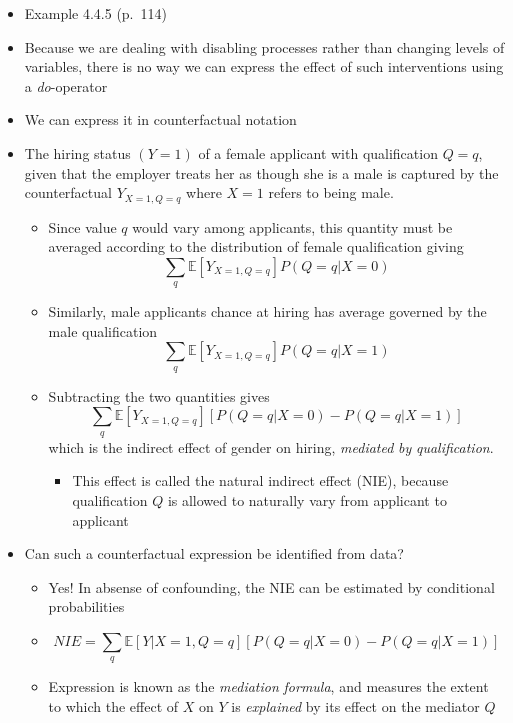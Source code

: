 \documentclass[]{article}
\providecommand{\tightlist}{%
  \setlength{\itemsep}{0pt}\setlength{\parskip}{0pt}}
\begin{document}
\begin{itemize}
\item
  Example 4.4.5 (p.~114)
\item
  Because we are dealing with disabling processes rather than changing
  levels of variables, there is no way we can express the effect of such
  interventions using a \emph{do}-operator
\item
  We can express it in counterfactual notation
\item
  The hiring status \((Y=1)\) of a female applicant with qualification
  \(Q = q\), given that the employer treats her as though she is a male
  is captured by the counterfactual \(Y_{X = 1, Q = q}\) where \(X = 1\)
  refers to being male.

  \begin{itemize}
  \item
    Since value \(q\) would vary among applicants, this quantity must be
    averaged according to the distribution of female qualification
    giving \[\sum\limits_q \mathbb{E}[Y_{X=1, Q = q}]P(Q = q|X = 0)\]
  \item
    Similarly, male applicants chance at hiring has average governed by
    the male qualification
    \[\sum\limits_q \mathbb{E}[Y_{X=1, Q = q}]P(Q = q|X = 1)\]
  \item
    Subtracting the two quantities gives
    \[\sum\limits_q \mathbb{E}[Y_{X=1, Q = q}][P(Q = q|X = 0)- P(Q = q|X = 1)]\]
    which is the indirect effect of gender on hiring, \emph{mediated}
    \emph{by} \emph{qualification}.

    \begin{itemize}
    \tightlist
    \item
      This effect is called the natural indirect effect (NIE), because
      qualification \(Q\) is allowed to naturally vary from applicant to
      applicant
    \end{itemize}
  \end{itemize}
\item
  Can such a counterfactual expression be identified from data?

  \begin{itemize}
  \item
    Yes! In absense of confounding, the NIE can be estimated by
    conditional probabilities
  \item
    \begin{equation*}
    NIE = \sum\limits_q \mathbb{E}[Y|X = 1, Q = q][P(Q = q|X = 0) - P(Q = q|X = 1)]
      \end{equation*}
  \item
    Expression is known as the \emph{mediation} \emph{formula}, and
    measures the extent to which the effect of \(X\) on \(Y\) is
    \emph{explained} by its effect on the mediator \(Q\)
  \end{itemize}
\end{itemize}
\end{document}
